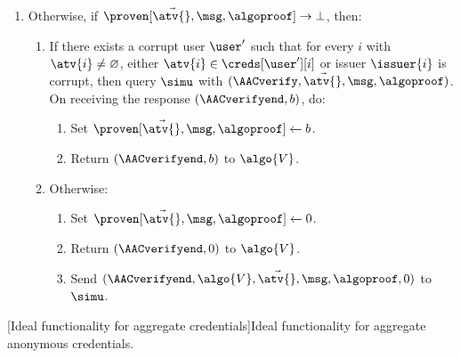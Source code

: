 \begin{framed}
\begin{enumerate}
	  \item Otherwise, if $\proven[\vec{\atv{}}, \msg, \algoproof]
\rightarrow \bot$, then:

	    \begin{enumerate}

	      \item If there exists a corrupt user $\user'$ such that for every $i$ with $\atv{i} \neq \varnothing$, either $\atv{i} \in
\creds[\user'][i]$ or issuer $\issuer{i}$ is corrupt, then query $\simu$ with
$(\AACverify, \vec{\atv{}}, \msg,\algoproof)$. On receiving the response
$(\AACverifyend, b)$, do:

		\begin{enumerate}

		  \item Set $\proven[\vec{\atv{}}, \msg, \algoproof] \leftarrow
b$.

		  \item Return $(\AACverifyend, b)$ to $\algo{V}$.

		\end{enumerate}

	      \item Otherwise:

		\begin{enumerate}

		  \item Set $\proven[\vec{\atv{}}, \msg, \algoproof] \leftarrow
0$.

		  \item Return $(\AACverifyend, 0)$ to $\algo{V}$.

		  \item Send $(\AACverifyend, \algo{V}, \vec{\atv{}}, \msg,
\allowbreak \algoproof, \allowbreak 0)$ to $\simu$.

		\end{enumerate}

	    \end{enumerate}

	\end{enumerate}

    \end{framed}

[Ideal functionality for aggregate credentials]{Ideal functionality for aggregate anonymous
credentials.}\label{fig:agg-creds-faac}
\endgroup
